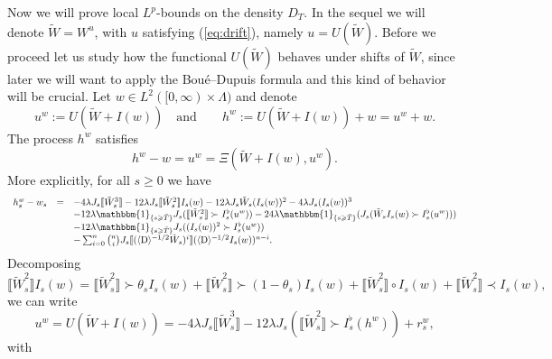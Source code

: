 \documentclass[11pt]{article}
\newcommand{\assign}{:=}
\newcommand{\mathD}{\mathrm{D}}
\begin{document}
Now we will prove local $L^p$-bounds on the density $D_T$. In the sequel we
will denote $\tilde{W} = W^u$, with $u$ satisfying (\ref{eq:drift}), namely $u
= U (\tilde{W})$. Before we proceed let us study how the functional $U
(\tilde{W})$ behaves under shifts of $\tilde{W}$, since later we will want to
apply the Bou{\'e}--Dupuis formula and this kind of behavior will be crucial.
Let $w \in L^2 ([0, \infty) \times \Lambda)$ and denote
\[ u^w \assign U (\tilde{W} + I (w)) \quad \text{and} \qquad h^w \assign U
   (\tilde{W} + I (w)) + w = u^w + w. \]
The process $h^w$ satisfies
\[ h^w - w = u^w = \Xi (\tilde{W} + I (w), u^w) . \]
More explicitly, for all $s \geqslant 0$ we have
\[ \begin{array}{lll}
     h^w_s - w_s & = & - 4 \lambda J_s \llbracket \tilde{W}_s^3 \rrbracket -
     12 \lambda J_s \llbracket \tilde{W}_s^2 \rrbracket I_s (w) - 12 \lambda
     J_s \tilde{W}_s (I_s (w))^2 - 4 \lambda J_s (I_s (w))^3\\
     &  & - 12 \lambda \mathbbm{1}_{\{ s \geqslant \bar{T} \}} J_s
     (\llbracket \tilde{W}^2_s \rrbracket \succ_{} I_s^{\flat} (u^w)) - 24
     \lambda \mathbbm{1}_{\{ s \geqslant \bar{T} \}} (J_s (\tilde{W}_s I_s (w)
     \succ I^{\flat}_s (u^w)))\\
     &  & - 12 \lambda \mathbbm{1}_{\{ s \geqslant \bar{T} \}} J_s ((I_s
     (w))^2 \succ I^{\flat}_s (u^w))\\
     &  & - \sum_{i = 0}^n \binom{n}{i} J_s \llbracket (\langle \mathD
     \rangle^{- 1 / 2} \tilde{W}_s)^i \rrbracket (\langle \mathD \rangle^{- 1
     / 2} I_s (w))^{n - i} .
   \end{array} \]
Decomposing
\[ \llbracket \tilde{W}_s^2 \rrbracket I_s (w) = \llbracket \tilde{W}_s^2
   \rrbracket \succ \theta_s I_s (w) + \llbracket \tilde{W}_s^2 \rrbracket
   \succ (1 - \theta_s) I_s (w) + \llbracket \tilde{W}_s^2 \rrbracket \circ
   I_s (w) + \llbracket \tilde{W}_s^2 \rrbracket \prec I_s (w), \]
we can write
\begin{equation}
  u^w = U (\tilde{W} + I (w)) = - 4 \lambda J_s \llbracket \tilde{W}_s^3
  \rrbracket - 12 \lambda J_s (\llbracket \tilde{W}_s^2 \rrbracket \succ
  I_s^{\flat} (h^w)) + r_s^w, \label{eq:uw}
\end{equation}
with
\end{document}
